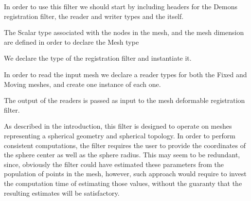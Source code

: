 \documentclass{InsightArticle}
\begin{document}
In order to use this filter we should start by including headers for the Demons
registration filter, the reader and writer types and the 
itself.

\begin{center}

\end{center}

The Scalar type associated with the nodes in the mesh, and the mesh dimension
are defined in order to declare the Mesh type

\begin{center}

\end{center}

We declare the type of the registration filter and instantiate it.


\begin{center}

\end{center}

In order to read the input mesh we declare a reader types for both the Fixed
and Moving meshes, and create one instance of each one.

\begin{center}

\end{center}

The output of the readers is passed as input to the mesh deformable
registration filter.

\begin{center}

\end{center}

As described in the introduction, this filter is designed to operate on meshes
representing a spherical geometry and spherical topology. In order to perform
consistent computations, the filter requires the user to provide the
coordinates of the sphere center as well as the sphere radius. This may seem to
be redundant, since, obviously the filter could have estimated these parameters
from the population of points in the mesh, however, such approach would require
to invest the computation time of estimating those values, without the guaranty
that the resulting estimates will be satisfactory.
\end{document}
